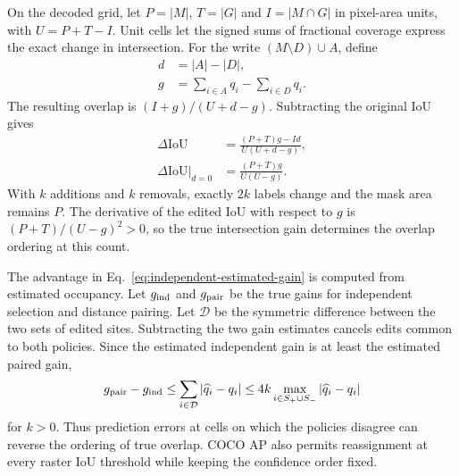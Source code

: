 \documentclass[journal]{IEEEtran}
\begin{document}
On the decoded grid, let \(P=|M|\), \(T=|G|\) and \(I=|M\cap G|\) in pixel-area units, with \(U=P+T-I\). Unit cells let the signed sums of fractional coverage express the exact change in intersection. For the write \((M\setminus D)\cup A\), define
\begin{equation}
\begin{aligned}
d &= |A|-|D|,\\
g &= \sum_{i\in A}q_i-\sum_{i\in D}q_i .
\end{aligned}
\label{eq:intersect-changes}
\end{equation}
The resulting overlap is \((I+g)/(U+d-g)\). Subtracting the original IoU gives
\begin{equation}
\begin{aligned}
\Delta\mathrm{IoU}
 &= \frac{(P+T)g-Id}{U(U+d-g)},\\
\left.\Delta\mathrm{IoU}\right|_{d=0}
 &= \frac{(P+T)g}{U(U-g)}.
\end{aligned}
\label{eq:variable-area}
\end{equation}
With \(k\) additions and \(k\) removals, exactly \(2k\) labels change and the mask area remains \(P\). The derivative of the edited IoU with respect to \(g\) is \((P+T)/(U-g)^2>0\), so the true intersection gain determines the overlap ordering at this count.

The advantage in Eq.~\eqref{eq:independent-estimated-gain} is computed from estimated occupancy. Let \(g_{\rm ind}\) and \(g_{\rm pair}\) be the true gains for independent selection and distance pairing. Let \(\mathcal D\) be the symmetric difference between the two sets of edited sites. Subtracting the two gain estimates cancels edits common to both policies. Since the estimated independent gain is at least the estimated paired gain,
\begin{equation}
 g_{\rm pair}-g_{\rm ind}
 \le \sum_{i\in\mathcal D}|\widehat q_i-q_i|
 \le 4k\max_{i\in S_+\cup S_-}|\widehat q_i-q_i|
 \label{eq:selection-error}
\end{equation}
for \(k>0\). Thus prediction errors at cells on which the policies disagree can reverse the ordering of true overlap. COCO AP also permits reassignment at every raster IoU threshold while keeping the confidence order fixed.
\end{document}
